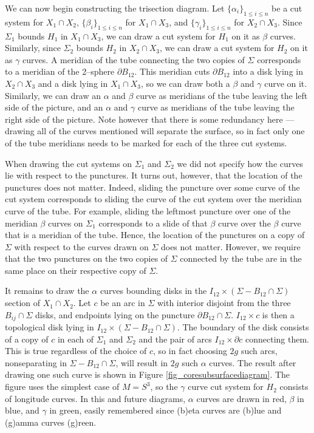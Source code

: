 \documentclass[12pt]{amsart}
\newcommand{\del}{\partial }
\theoremstyle{definition}
\theoremstyle{remark}
\begin{document}
We can now begin constructing the trisection diagram.
Let $\{\alpha_i\}_{1 \le i \le n}$ be a cut system for $X_1 \cap X_2$, $\{\beta_i\}_{1 \le i \le n}$ for $X_1 \cap X_3$, and $\{\gamma_i\}_{1 \le i \le n}$ for $X_2 \cap X_3$.
Since $\Sigma_1$ bounds $H_1$ in $X_1 \cap X_3$, we can draw a cut system for $H_1$ on it as $\beta$ curves.
Similarly, since $\Sigma_2$ bounds $H_2$ in $X_2 \cap X_3$, we can draw a cut system for $H_2$ on it as $\gamma$ curves.
A meridian of the tube connecting the two copies of $\Sigma$ corresponds to a meridian of the 2--sphere $\del B_{12}$.
This meridian cuts $\del B_{12}$ into a disk lying in $X_2 \cap X_3$ and a disk lying in $X_1 \cap X_3$, so we can draw both a $\beta$ and $\gamma$ curve on it.
Similarly, we can draw an $\alpha$ and $\beta$ curve as meridians of the tube leaving the left side of the picture, and an $\alpha$ and $\gamma$ curve as meridians of the tube leaving the right side of the picture.
Note however that there is some redundancy here --- drawing all of the curves mentioned will separate the surface, so in fact only one of the tube meridians needs to be marked for each of the three cut systems.

When drawing the cut systems on $\Sigma_1$ and $\Sigma_2$ we did not specify how the curves lie with respect to the punctures.
It turns out, however, that the location of the punctures does not matter.
Indeed, sliding the puncture over some curve of the cut system corresponds to sliding the curve of the cut system over the meridian curve of the tube.
For example, sliding the leftmost puncture over one of the meridian $\beta$ curves on $\Sigma_1$ corresponds to a slide of that $\beta$ curve over the $\beta$ curve that is a meridian of the tube.
Hence, the location of the punctures on a copy of $\Sigma$ with respect to the curves drawn on $\Sigma$ does not matter.
However, we require that the two punctures on the two copies of $\Sigma$ connected by the tube are in the same place on their respective copy of $\Sigma$.


It remains to draw the $\alpha$ curves bounding disks in the $I_{12} \times (\Sigma - B_{12} \cap \Sigma)$ section of $X_1 \cap X_2$.
 Let $c$ be an arc in $\Sigma$ with interior disjoint from the three $B_{ij} \cap \Sigma$ disks, and endpoints lying on the puncture $\del B_{12} \cap \Sigma$.
$I_{12} \times c$ is then a topological disk lying in $I_{12} \times (\Sigma - B_{12} \cap \Sigma)$.
The boundary of the disk consists of a copy of $c$ in each of $\Sigma_1$ and $\Sigma_2$ and the pair of arcs $I_{12} \times \del c$ connecting them.
This is true regardless of the choice of $c$, so in fact choosing $2g$ such arcs, nonseparating in $\Sigma - B_{12} \cap \Sigma$, will result in $2g$ such $\alpha$ curves.
The result after drawing one such curve is shown in Figure \ref{fig_coresubsurfacediagram}.
The figure uses the simplest case of $M = S^3$, so the $\gamma$ curve cut system for $H_2$ consists of longitude curves.
In this and future diagrams, $\alpha$ curves are drawn in red, $\beta$ in blue, and $\gamma$ in green, easily remembered since (b)eta curves are (b)lue and (g)amma curves (g)reen.
\end{document}
